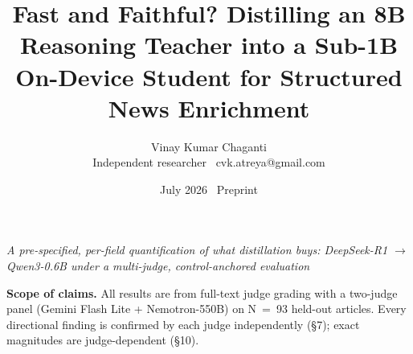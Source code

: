 \documentclass[11pt]{article}
\title{Fast and Faithful? Distilling an 8B Reasoning Teacher into a Sub-1B On-Device Student for Structured News Enrichment}
\author{Vinay Kumar Chaganti\\ \small Independent researcher \textperiodcentered\ cvk.atreya@gmail.com}
\date{July 2026 \textperiodcentered\ Preprint}
\begin{document}
\maketitle
\begin{center}\itshape A pre-specified, per-field quantification of what distillation buys: DeepSeek-R1 $\rightarrow$ Qwen3-0.6B under a multi-judge, control-anchored evaluation\end{center}
\vspace{0.5em}
\noindent \textbf{Scope of claims.} All results are from full-text judge grading with a two-judge panel (Gemini Flash Lite + Nemotron-550B) on N~=~93 held-out articles. Every directional finding is confirmed by each judge independently (\S7); exact magnitudes are judge-dependent (\S10).
\vspace{1em}
\end{document}

